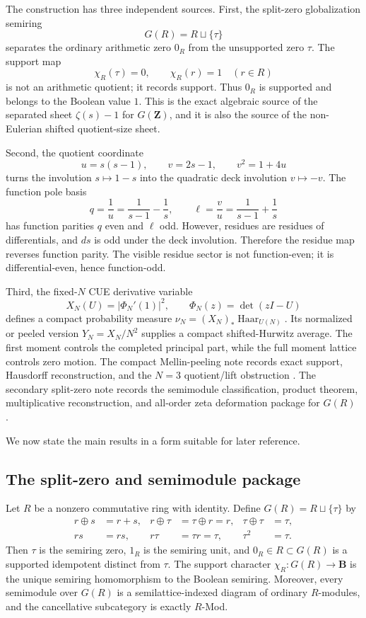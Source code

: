 \documentclass[11pt]{article}
\newcommand{\Z}{\mathbf Z}
\newcommand{\B}{\mathbf B}
\newcommand{\Haar}{\operatorname{Haar}}
\theoremstyle{plain}
\theoremstyle{definition}
\numberwithin{equation}{section}
\begin{document}
The construction has three independent sources.
First, the split-zero globalization semiring
\[
G(R)=R\sqcup\{\tau\}
\]
separates the ordinary arithmetic zero \(0_R\) from the unsupported zero \(\tau\).  The support map
\[
\chi_R(\tau)=0,\qquad \chi_R(r)=1\quad(r\in R)
\]
is not an arithmetic quotient; it records support.  Thus \(0_R\) is supported and belongs to the Boolean value \(1\).  This is the exact algebraic source of the separated sheet \(\zeta(s)-1\) for \(G(\Z)\), and it is also the source of the non-Eulerian shifted quotient-size sheet.

Second, the quotient coordinate
\[
 u=s(s-1),\qquad v=2s-1,\qquad v^2=1+4u
\]
turns the involution \(s\mapsto1-s\) into the quadratic deck involution \(v\mapsto -v\).  The function pole basis
\[
 q=\frac1u=\frac1{s-1}-\frac1s,
 \qquad
 \ell=\frac vu=\frac1{s-1}+\frac1s
\]
has function parities \(q\) even and \(\ell\) odd.  However, residues are residues of differentials, and \(ds\) is odd under the deck involution.  Therefore the residue map reverses function parity.  The visible residue sector is not function-even; it is differential-even, hence function-odd.

Third, the fixed-\(N\) CUE derivative variable
\[
 X_N(U)=|\Phi_N'(1)|^2,
 \qquad
 \Phi_N(z)=\det(zI-U)
\]
defines a compact probability measure \(\nu_N=(X_N)_*\Haar_{U(N)}\).  Its normalized or peeled version \(Y_N=X_N/N^2\) supplies a compact shifted-Hurwitz average.  The first moment controls the completed principal part, while the full moment lattice controls zero motion.  The compact Mellin-peeling note records exact support, Hausdorff reconstruction, and the \(N=3\) quotient/lift obstruction \cite{CUEPeeling}.  The secondary split-zero note records the semimodule classification, product theorem, multiplicative reconstruction, and all-order zeta deformation package for \(G(R)\) \cite{SplitZeroSecondary}.

We now state the main results in a form suitable for later reference.

\subsection{The split-zero and semimodule package}

Let \(R\) be a nonzero commutative ring with identity.  Define \(G(R)=R\sqcup\{\tau\}\) by
\begin{align*}
 r\oplus s&=r+s, & r\oplus\tau&=\tau\oplus r=r, & \tau\oplus\tau&=\tau,\\
 rs&=rs, & r\tau&=\tau r=\tau, & \tau^2&=\tau.
\end{align*}
Then \(\tau\) is the semiring zero, \(1_R\) is the semiring unit, and \(0_R\in R\subset G(R)\) is a supported idempotent distinct from \(\tau\).  The support character \(\chi_R:G(R)\to\B\) is the unique semiring homomorphism to the Boolean semiring.  Moreover, every semimodule over \(G(R)\) is a semilattice-indexed diagram of ordinary \(R\)-modules, and the cancellative subcategory is exactly \(R\)-Mod.
\end{document}
